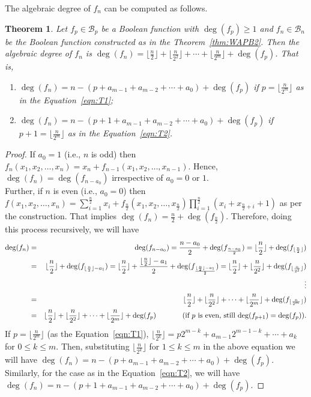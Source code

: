 \documentclass{article}[12pt]
\newtheorem{theorem}{Theorem}[section]
\newcommand{\CB}{\mathcal{B}}
\begin{document}
The algebraic degree of $f_n$ can be computed as follows.
\begin{theorem}\label{thm:deg}
Let $f_p \in \CB_p$ be a Boolean function with $\deg(f_p) \geq 1$ and $f_n \in \CB_n$ be the Boolean function constructed as in the Theorem~\ref{thm:WAPB2}. Then the algebraic degree of $f_n$ is $\deg(f_n) = \lfloor\frac{n}{2}\rfloor + \lfloor\frac{n}{2^2}\rfloor + \cdots + \lfloor\frac{n}{2^m}\rfloor + \deg(f_{p})$. That is,
\begin{enumerate}
 \item  $\deg(f_n) = n - (p+a_{m-1}+a_{m-2}+\cdots+a_0)+\deg(f_p)$ if $p = \lfloor\frac{n}{2^m}\rfloor$ as in the Equation~\ref{eqn:T1};
 \item $\deg(f_n) = n - (p+1+a_{m-1}+a_{m-2}+\cdots+a_0)+\deg(f_p)$ if $p+1 = \lfloor\frac{n}{2^m}\rfloor$ as in the Equation~\ref{eqn:T2}.
\end{enumerate}


\end{theorem}
\begin{proof}
If $a_0 = 1$ (i.e., $n$ is odd) then $f_n(x_1, x_2, \ldots,x_n) = x_n + f_{n-1}(x_1, x_2, \ldots,x_{n-1})$. Hence, $\deg(f_n) = \deg(f_{n-a_0})$ irrespective of $a_0 = 0$ or $1$.\\
Further, if $n$ is even (i.e., $a_0 = 0$) then
$f(x_1, x_2, \ldots,x_n) = \displaystyle{\sum_{i=1}^{\frac{n}{2}} x_{i} + f_{\frac{n}{2}}(x_1,x_2,\ldots,x_\frac{n}{2})\prod_{i=1}^{\frac{n}{2}} (x_i + x_{\frac{n}{2} + i} + 1)}$ as per the construction. That implies $\deg(f_n) = \frac{n}{2} + \deg(f_\frac{n}{2})$.
Therefore, doing this process recursively, we will have
\begin{eqnarray*}
\deg(f_n) & = & \deg(f_{n-a_0}) = \frac{n-a_0}{2} + 
\deg(f_\frac{n-a_0}{2}) = \lfloor\frac{n}{2}\rfloor + 
\deg(f_{\lfloor\frac{n}{2}\rfloor})\\
& = & \lfloor\frac{n}{2}\rfloor + \deg(f_{\lfloor\frac{n}{2}\rfloor-a_1})
= \lfloor\frac{n}{2}\rfloor + \frac{\lfloor\frac{n}{2}\rfloor-a_1}{2} + \deg(f_{\frac{\lfloor\frac{n}{2}\rfloor-a_1}{2}}) = \lfloor\frac{n}{2}\rfloor + \lfloor\frac{n}{2^2}\rfloor + \deg(f_{\lfloor\frac{n}{2^2}\rfloor})\\
& & \vdots \\
& = & \lfloor\frac{n}{2}\rfloor + \lfloor\frac{n}{2^2}\rfloor + \cdots + \lfloor\frac{n}{2^m}\rfloor + \deg(f_{\lfloor\frac{n}{2^m}\rfloor})\\
& = & \lfloor\frac{n}{2}\rfloor + \lfloor\frac{n}{2^2}\rfloor + \cdots + \lfloor\frac{n}{2^m}\rfloor + \deg(f_{p}) \hspace{.5in}\text{(if $p$ is even, still $\deg(f_{p+1}) = \deg(f_p)$)}.
\end{eqnarray*}
If $p = \lfloor\frac{n}{2^m}\rfloor$ (as the Equation~\ref{eqn:T1}), $\lfloor\frac{n}{2^k}\rfloor = p2^{m-k} + a_{m-1}2^{m-1-k} + \cdots + a_k$ for $0 \leq k \leq m$.
Then, substituting $\lfloor\frac{n}{2^k}\rfloor$ for $1 \leq k \leq m$ in the above equation we will have
$\deg(f_n) = n - (p+a_{m-1}+a_{m-2}+\cdots+a_0)+\deg(f_p)$.
Similarly, for the case as in the Equation~\ref{eqn:T2}, we will have $\deg(f_n) = n - (p+1+a_{m-1}+a_{m-2}+\cdots+a_0)+\deg(f_p)$.
\end{proof}
\end{document}
